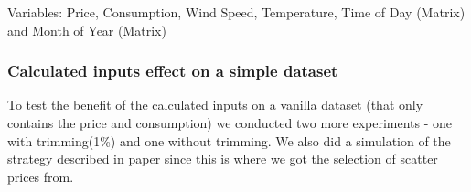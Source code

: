 Variables: Price, Consumption, Wind Speed, Temperature, Time of Day (Matrix) and Month of Year (Matrix)
\begin{table}[H]
\centering  %
\caption{Calculated inputs effect on result \#3 from experiment 1.} %
\label{table:Statistical3} %
\end{table}

\subsubsection{Calculated inputs effect on a simple dataset}
To test the benefit of the calculated inputs on a vanilla dataset (that only contains the price and consumption) we conducted two more experiments - one with trimming(1\%) and one without trimming. We also did a simulation of the strategy described in paper \cite{singhal2011electricity} since this is where we got the selection of scatter prices from.


